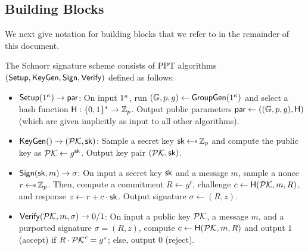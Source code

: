 \subsection{Building Blocks}

We next give notation for building blocks that we refer to in the remainder of
this document.

\begin{definition} \label{defn:schnorr}
The Schnorr signature scheme consists of PPT algorithms $(\mathsf{Setup}, \mathsf{KeyGen}, \mathsf{Sign}, \mathsf{Verify})$ defined as follows:

  \begin{itemize}[itemsep=1mm]

    \item $\mathsf{Setup}(1^\kappa) \rightarrow \mathsf{par}$:
    On input $1^\kappa$, run $(\mathbb{G}, p, g) \gets \mathsf{GroupGen}(1^{\kappa})$ and select a hash function $\mathsf{H}: \{0,1\}^* \rightarrow \mathbb{Z}_p$. Output public parameters $\mathsf{par} \gets ((\mathbb{G}, p, g), \mathsf{H})$ (which are given implicitly as input to all other algorithms).

  \item $\mathsf{KeyGen}() \rightarrow (\mathcal{PK}, \mathsf{sk})$:
  Sample a secret key $\sk \randpick \Zp$ and compute the public key as $\mathcal{PK} \gets g^{\mathsf{sk}}$.
    Output key pair $(\mathcal{PK}, \mathsf{sk})$.

  \item $\mathsf{Sign}(\mathsf{sk}, m) \rightarrow \sigma$:
    On input a secret key $\mathsf{sk}$ and a message $m$, sample a nonce $r \randpick \Zp$. Then, compute a
     commitment $R \gets g^r$,  challenge $c \gets \mathsf{H}(\mathcal{PK}, m, R)$, and
    response $z \gets r + c \cdot \mathsf{sk}$. Output signature $\sigma \gets (R,z)$.

  \item $\mathsf{Verify}(\mathcal{PK}, m, \sigma) \rightarrow 0/1$:
  On input a public key $\mathcal{PK}$,
    a message $m$, and a purported signature $\sigma = (R, z)$, compute $c
    \leftarrow \mathsf{H}(\mathcal{PK}, m, R)$ and output $1$ (accept) if $R \cdot \mathcal{PK}^c = g^z$; else, output $0$ (reject).

\end{itemize}
\end{definition}

